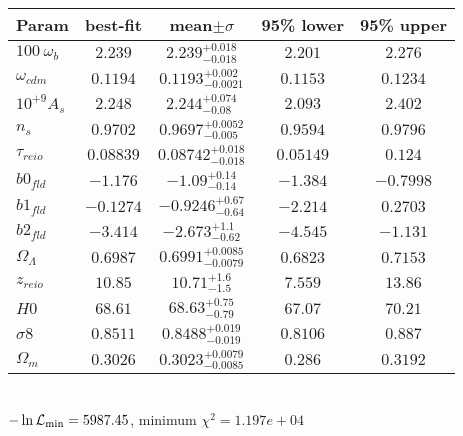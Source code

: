 \begin{tabular}{|l|c|c|c|c|} 
 \hline 
Param & best-fit & mean$\pm\sigma$ & 95\% lower & 95\% upper \\ \hline 
$100~\omega_{b }$ &$2.239$ & $2.239_{-0.018}^{+0.018}$ & $2.201$ & $2.276$ \\ 
$\omega_{cdm }$ &$0.1194$ & $0.1193_{-0.0021}^{+0.002}$ & $0.1153$ & $0.1234$ \\ 
$10^{+9}A_{s }$ &$2.248$ & $2.244_{-0.08}^{+0.074}$ & $2.093$ & $2.402$ \\ 
$n_{s }$ &$0.9702$ & $0.9697_{-0.005}^{+0.0052}$ & $0.9594$ & $0.9796$ \\ 
$\tau_{reio }$ &$0.08839$ & $0.08742_{-0.018}^{+0.018}$ & $0.05149$ & $0.124$ \\ 
$b0_{fld }$ &$-1.176$ & $-1.09_{-0.14}^{+0.14}$ & $-1.384$ & $-0.7998$ \\ 
$b1_{fld }$ &$-0.1274$ & $-0.9246_{-0.64}^{+0.67}$ & $-2.214$ & $0.2703$ \\ 
$b2_{fld }$ &$-3.414$ & $-2.673_{-0.62}^{+1.1}$ & $-4.545$ & $-1.131$ \\ 
$\Omega_{\Lambda }$ &$0.6987$ & $0.6991_{-0.0079}^{+0.0085}$ & $0.6823$ & $0.7153$ \\ 
$z_{reio }$ &$10.85$ & $10.71_{-1.5}^{+1.6}$ & $7.559$ & $13.86$ \\ 
$H0$ &$68.61$ & $68.63_{-0.79}^{+0.75}$ & $67.07$ & $70.21$ \\ 
$\sigma8$ &$0.8511$ & $0.8488_{-0.019}^{+0.019}$ & $0.8106$ & $0.887$ \\ 
$\Omega_{m }$ &$0.3026$ & $0.3023_{-0.0085}^{+0.0079}$ & $0.286$ & $0.3192$ \\ 
\hline 
 \end{tabular} \\ 
$-\ln{\cal L}_\mathrm{min} =5987.45$, minimum $\chi^2=1.197e+04$ \\ 

